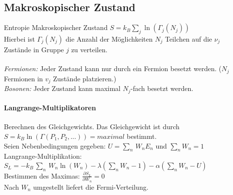 \documentclass[a4paper,11pt]{scrartcl}
\begin{document}
\subsection{Makroskopischer Zustand}
Entropie Makroskopischer Zustand $S = k_B \sum_j \ln (\Gamma_j (N_j))$\\
Hierbei ist $ \Gamma_j (N_j)  $ die Anzahl der Möglichkeiten $N_j$ Teilchen auf die $\nu_j$  Zustände in Gruppe $j$ zu verteilen. \\
\\
\textit{Fermionen:} Jeder Zustand kann nur durch ein Fermion besetzt werden. ($N_j$ Fermionen in $v_j$ Zustände platzieren.)\\
\textit{Bosonen:} Jeder Zustand kann maximal $N_j$-fach besetzt werden.\\
\\
\textbf{Langrange-Multiplikatoren}\\
\\
Berechnen des Gleichgewichts. Das Gleichgewicht ist durch $S = k_B \ln(\Gamma(P_1, P_2, ...)) = maximal$ bestimmt.\\ 
Seien Nebenbedingungen gegeben: $U = \sum_n \, W_n E_n$ und $\sum_n W_n = 1$\\
Langrange-Multiplikation: $S_L = -k_B \, \sum_n \, W_n \ln(W_n) - \lambda (\sum_n W_n-1)- \alpha(\sum_n W_n-U)$\\
Bestimmen des Maximas: $\frac{\partial S_L}{\partial W_n} = 0$\\
Nach $W_n$ umgestellt liefert die Fermi-Verteilung. 
\end{document}
